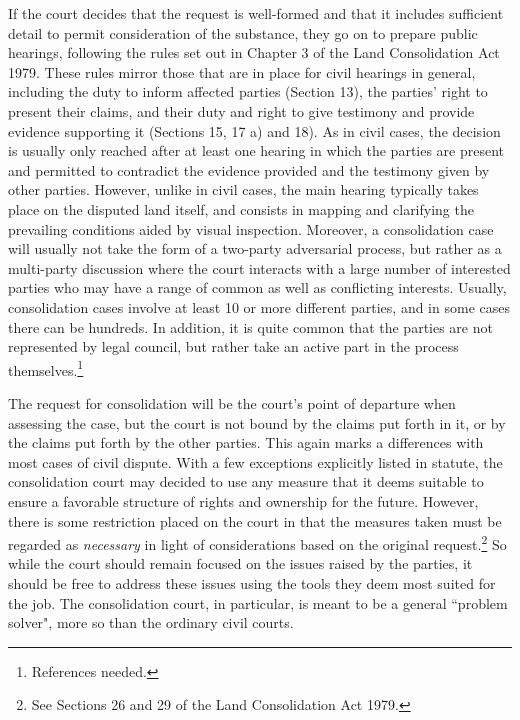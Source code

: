 If the court decides that the request is well-formed and that it includes sufficient detail to permit consideration of the substance, they go on to prepare public hearings, following the rules set out in Chapter 3 of the Land Consolidation Act 1979. These rules mirror those that are in place for civil hearings in general, including the duty to inform affected parties (Section 13), the parties' right to present their claims, and their duty and right to give testimony and provide evidence supporting it (Sections 15, 17 a) and 18). As in civil cases, the decision is usually only reached after at least one hearing in which the parties are present and permitted to contradict the evidence provided and the testimony given by other parties. However, unlike in civil cases, the main hearing typically takes place on the disputed land itself, and consists in mapping and clarifying the prevailing conditions aided by visual inspection. Moreover, a consolidation case will usually not take the form of a two-party adversarial process, but rather as a multi-party discussion where the court interacts with a large number of interested parties who may have a range of common as well as conflicting interests. Usually, consolidation cases involve at least 10 or more different parties, and in some cases there can be hundreds. In addition, it is quite common that the parties are not represented by legal council, but rather take an active part in the process themselves.\footnote{References needed.}

The request for consolidation will be the court's point of departure when assessing the case, but the court is not bound by the claims put forth in it, or by the claims put forth by the other parties. This again marks a differences with most cases of civil dispute. With a few exceptions explicitly listed in statute, the consolidation court may decided to use any measure that it deems suitable to ensure a favorable structure of rights and ownership for the future. However, there is some restriction placed on the court in that the measures taken must be regarded as \emph{necessary} in light of considerations based on the original request.\footnote{See Sections 26 and 29 of the Land Consolidation Act 1979.} So while the court should remain focused on the issues raised by the parties, it should be free to address these issues using the tools they deem most suited for the job. The consolidation court, in particular, is meant to be a general ``problem solver", more so than the ordinary civil courts.


